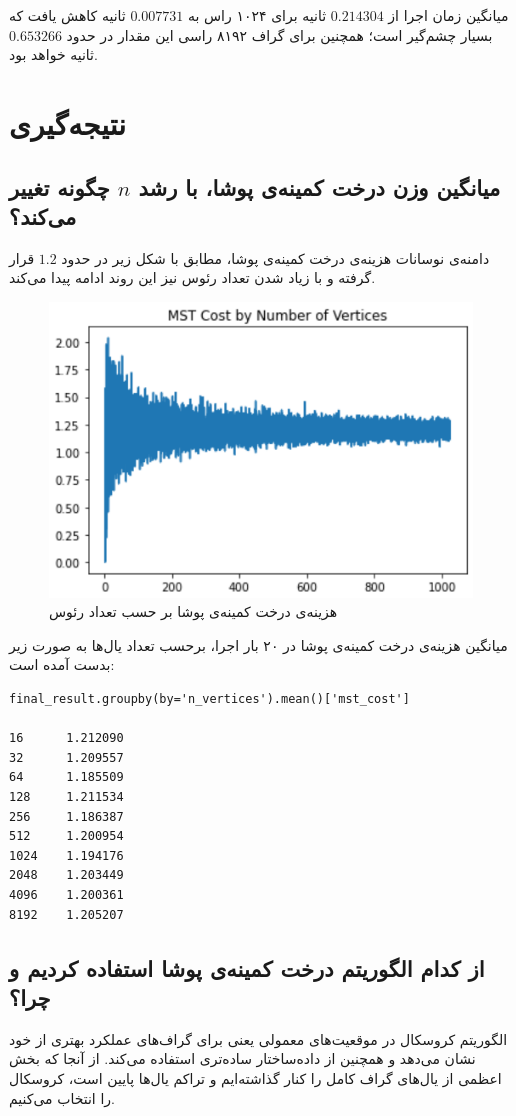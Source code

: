 \documentclass{article}
\begin{document}
میانگین زمان اجرا از
$0.214304$
ثانیه برای ۱۰۲۴ راس به
$0.007731$
ثانیه کاهش یافت که بسیار چشم‌گیر است؛ همچنین برای گراف ۸۱۹۲ راسی این مقدار در حدود
$0.653266$
ثانیه خواهد بود.
\section{نتیجه‌گیری}
\subsection{میانگین وزن درخت کمینه‌ی پوشا، با رشد 
$n$
چگونه تغییر می‌کند؟}
دامنه‌ی نوسانات هزینه‌ی درخت کمینه‌ی پوشا، مطابق با شکل زیر در حدود
$1.2$
قرار گرفته و با زیاد شدن تعداد رئوس نیز این روند ادامه پیدا می‌کند.

\begin{figure}[H]
    \centering
    \includegraphics[width=0.6\linewidth]{Photos/Randomized mst/mst_cost.png}
    \caption{
    هزینه‌ی درخت کمینه‌ی پوشا بر حسب تعداد رئوس
    }
    \label{fig:my_label}
\end{figure}

میانگین هزینه‌ی درخت کمینه‌ی پوشا در ۲۰ بار اجرا، برحسب تعداد یال‌ها به صورت زیر بدست آمده است:

\begin{latin}
\begin{verbatim}
final_result.groupby(by='n_vertices').mean()['mst_cost']

16      1.212090
32      1.209557
64      1.185509
128     1.211534
256     1.186387
512     1.200954
1024    1.194176
2048    1.203449
4096    1.200361
8192    1.205207
\end{verbatim}
\end{latin}
\subsection{از کدام الگوریتم درخت کمینه‌ی پوشا استفاده کردیم و چرا؟}
الگوریتم کروسکال در موقعیت‌های معمولی یعنی برای گراف‌های
عملکرد بهتری از خود نشان می‌دهد و همچنین از داده‌ساختار ساده‌تری استفاده می‌کند. از آنجا که بخش اعظمی از یال‌های گراف کامل را کنار گذاشته‌ایم و تراکم یال‌ها پایین است، کروسکال را انتخاب می‌کنیم.
\end{document}
